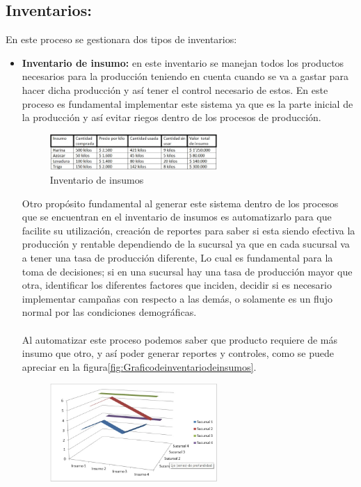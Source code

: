 \subsection{Inventarios:} En este proceso se gestionara dos tipos de inventarios:
	\begin{itemize}
		\item \textbf{Inventario de insumo:} en este inventario se manejan todos los productos necesarios para la producci\'on teniendo en cuenta cuando se va a gastar  para hacer dicha producci\'on y as\'i tener el control necesario de estos. En este proceso es fundamental implementar este sistema ya que es la parte inicial de la producci\'on y as\'i evitar riegos dentro de los procesos de producci\'on.
\begin{figure}[htbp]
	\centering
		\includegraphics[width=0.60\textwidth]{images/Inventarioinsumo.jpg}
	\caption{Inventario de insumos}
	\label{fig:Inventariodeinsumo}
\end{figure}%
%	
Otro prop\'osito fundamental al generar este sistema dentro de los procesos que se encuentran en el inventario de insumos es automatizarlo para que facilite su utilizaci\'on, creaci\'on de reportes para saber si esta siendo efectiva la producci\'on y rentable dependiendo de la sucursal ya que en cada sucursal va a tener una tasa de producci\'on diferente, Lo cual es fundamental para la toma de decisiones; si en una sucursal hay una tasa de producci\'on mayor que otra, identificar los diferentes factores que inciden, decidir si es necesario implementar campa\~nas con respecto a las dem\'as, o solamente es un flujo normal por las condiciones demogr\'aficas. 
\\%
\\%
Al automatizar este proceso podemos saber que producto requiere de m\'as insumo que otro, y as\'i poder generar reportes y controles, como se puede apreciar en la figura\ref{fig:Graficodeinventariodeinsumos}.
%
\begin{figure}[htbp]
	\centering
		\includegraphics[width=0.60\textwidth]{images/Graficoinventarioinsumo.jpg}

\end{figure}
\end{itemize}
